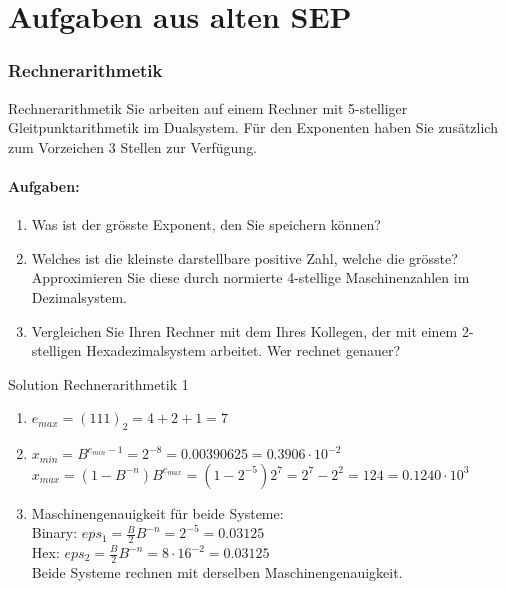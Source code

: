 \section{Aufgaben aus alten SEP}

\subsubsection{Rechnerarithmetik}

\begin{example2}{Rechnerarithmetik}
Sie arbeiten auf einem Rechner mit 5-stelliger Gleitpunktarithmetik im Dualsystem. Für den Exponenten haben Sie zusätzlich zum Vorzeichen 3 Stellen zur Verfügung.

\paragraph{Aufgaben:}
\begin{enumerate}
    \item Was ist der grösste Exponent, den Sie speichern können?
    \item Welches ist die kleinste darstellbare positive Zahl, welche die grösste? Approximieren Sie diese durch normierte 4-stellige Maschinenzahlen im Dezimalsystem.
    \item Vergleichen Sie Ihren Rechner mit dem Ihres Kollegen, der mit einem 2-stelligen Hexadezimalsystem arbeitet. Wer rechnet genauer?
\end{enumerate}
\end{example2}

\begin{KR}{Solution Rechnerarithmetik 1}
\begin{enumerate}
    \item $e_{max} = (111)_2 = 4 + 2 + 1 = 7$
    
    \item $x_{min} = B^{e_{min}-1} = 2^{-8} = 0.00390625 = 0.3906 \cdot 10^{-2}$\\
    $x_{max} = (1-B^{-n})B^{e_{max}} = (1-2^{-5})2^7 = 2^7 - 2^2 = 124 = 0.1240 \cdot 10^3$
    
    \item Maschinengenauigkeit für beide Systeme:\\
    Binary: $eps_1 = \frac{B}{2}B^{-n} = 2^{-5} = 0.03125$\\
    Hex: $eps_2 = \frac{B}{2}B^{-n} = 8 \cdot 16^{-2} = 0.03125$\\
    Beide Systeme rechnen mit derselben Maschinengenauigkeit.
\end{enumerate}
\end{KR}


